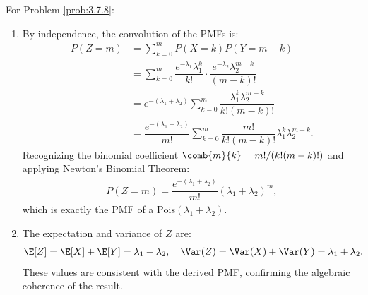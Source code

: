 \begin{solucion}
	\label{sol:3.7.8}
	For Problem \ref{prob:3.7.8}:
	\begin{enumerate}
		\item By independence, the convolution of the PMFs is:
		\begin{align*}
			P(Z = m) &= \sum_{k=0}^{m} P(X = k) P(Y = m-k) \\
			&= \sum_{k=0}^{m} \dfrac{e^{-\lambda_{1}} \lambda_{1}^{k}}{k!} \cdot \dfrac{e^{-\lambda_{2}} \lambda_{2}^{m-k}}{(m-k)!} \\
			&= e^{-(\lambda_{1} + \lambda_{2})} \sum_{k=0}^{m} \dfrac{\lambda_{1}^{k} \lambda_{2}^{m-k}}{k! (m-k)!} \\
			&= \dfrac{e^{-(\lambda_{1} + \lambda_{2})}}{m!} \sum_{k=0}^{m} \dfrac{m!}{k!(m-k)!} \lambda_{1}^{k} \lambda_{2}^{m-k}.
		\end{align*}
		Recognizing the binomial coefficient $\comb{m}{k} = m!/(k!(m-k)!)$ and applying Newton's Binomial Theorem:
		\begin{align*}
			P(Z = m) = \dfrac{e^{-(\lambda_{1} + \lambda_{2})}}{m!} (\lambda_{1} + \lambda_{2})^{m},
		\end{align*}
		which is exactly the PMF of a $\text{Pois}(\lambda_{1} + \lambda_{2})$.
		\item The expectation and variance of $Z$ are:
		\begin{align*}
			\E[Z] = \E[X] + \E[Y] = \lambda_{1} + \lambda_{2}, \quad \Var(Z) = \Var(X) + \Var(Y) = \lambda_{1} + \lambda_{2}.
		\end{align*}
		These values are consistent with the derived PMF, confirming the algebraic coherence of the result. \qedhere
	\end{enumerate}
\end{solucion}

